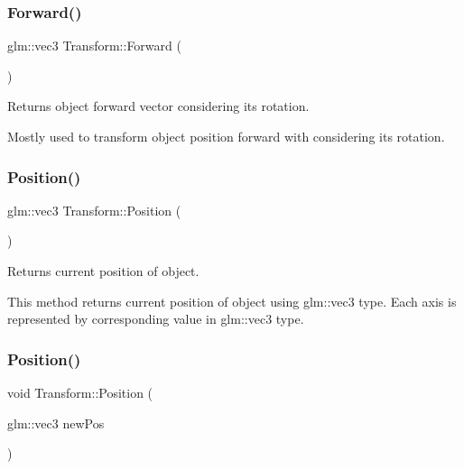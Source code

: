 \subsubsection{\texorpdfstring{Forward()}{Forward()}}
{\footnotesize\ttfamily glm\+::vec3 Transform\+::\+Forward (\begin{DoxyParamCaption}{ }\end{DoxyParamCaption})\hspace{0.3cm}{\ttfamily [inline]}}



Returns object forward vector considering it\textquotesingle{}s rotation. 

Mostly used to transform object position forward with considering it\textquotesingle{}s rotation. \mbox{\label{class_transform_ab3aa7217c2b53146ae0ec4a4eddf3ba0}} 
\subsubsection{\texorpdfstring{Position()}{Position()}\hspace{0.1cm}{\footnotesize\ttfamily [1/3]}}
{\footnotesize\ttfamily glm\+::vec3 Transform\+::\+Position (\begin{DoxyParamCaption}{ }\end{DoxyParamCaption})\hspace{0.3cm}{\ttfamily [inline]}}



Returns current position of object. 

This method returns current position of object using glm\+::vec3 type. Each axis is represented by corresponding value in glm\+::vec3 type. \mbox{\label{class_transform_a1f5f28293a7e54f8330f4090ea38b9f7}} 
\subsubsection{\texorpdfstring{Position()}{Position()}\hspace{0.1cm}{\footnotesize\ttfamily [2/3]}}
{\footnotesize\ttfamily void Transform\+::\+Position (\begin{DoxyParamCaption}\item[{glm\+::vec3}]{new\+Pos }\end{DoxyParamCaption})\hspace{0.3cm}{\ttfamily [inline]}}



